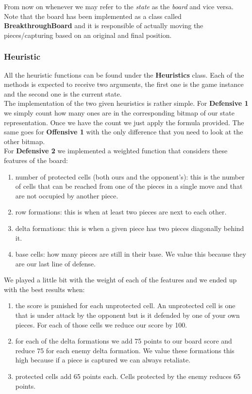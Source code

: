 \documentclass[11pt]{article}
\begin{document}
From now on whenever we may refer to the \textit{state} as the \textit{board} and vice versa. Note that the board has been implemented as a class called \textbf{BreakthroughBoard} and it is responsible of actually moving the pieces/capturing based on an original and final position.


\subsubsection*{Heuristic}
All the heuristic functions can be found under the \textbf{Heuristics} class. Each of the methods is expected to receive two arguments, the first one is the game instance and the second one is the current state. \\

The implementation of the two given heuristics is rather simple. For \textbf{Defensive 1} we simply count how many ones are in the corresponding bitmap of our state representation. Once we have the count we just apply the formula provided. The same goes for \textbf{Offensive 1} with the only difference that you need to look at the other bitmap. \\

For \textbf{Defensive 2} we implemented a weighted function that considers these features of the board:
\begin{enumerate}
\item number of protected cells (both ours and the opponent's): this is the number of cells that can be reached from one of the pieces in a single move and that are not occupied by another piece.
\item row formations: this is when at least two pieces are next to each other.
\item delta formations: this is when a given piece has two pieces diagonally behind it.
\item base cells: how many pieces are still in their base. We value this because they are our last line of defense.
\end{enumerate}

We played a little bit with the weight of each of the features and we ended up with the best results when:
\begin{enumerate}
\item the score is punished for each unprotected cell. An unprotected cell is one that is under attack by the opponent but is it defended by one of your own pieces. For each of those cells we reduce our score by 100.
\item for each of the delta formations we add 75 points to our board score and reduce 75 for each enemy delta formation. We value these formations this high because if a piece is captured we can always retaliate. 
\item protected cells add 65 points each. Cells protected by the enemy reduces 65 points.
\end{enumerate}
\end{document}
